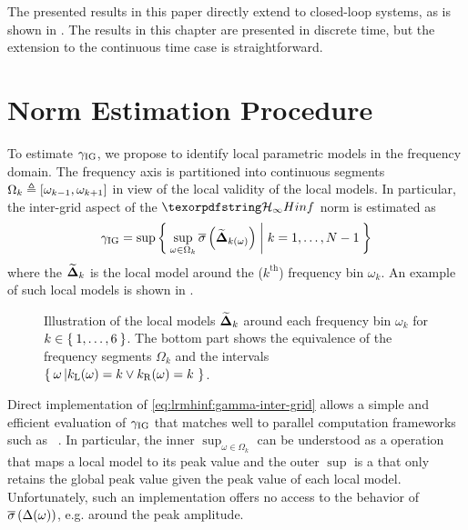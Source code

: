 The presented results in this paper directly extend to closed-loop systems, as is shown in .
The results in this chapter are presented in discrete time, but the extension to the continuous time case is straightforward.

\section{\Hinf{} Norm Estimation Procedure}
\label{sec:lrmhinf:LPMHinf}
To estimate $\gammaIntergrid$, we propose to identify local parametric models in the frequency domain.
The frequency axis is partitioned into continuous segments $\Omega_k \isdef \ClosedInterval{ \omega_{k-1} , \omega_{k+1} }$ in view of the local validity of the local models.
In particular, the inter-grid aspect of the $\Hinf$ norm is estimated as
\begin{equation}
  \gammaIntergrid = 
    \sup \Set{ 
                \sup_{\omega \in \Omega_k} \svdMax{\LocalModel[k(\omega)]{\Delta}}
                |
                k = 1,\ldots,N-1
                }
   \label{eq:lrmhinf:gamma-inter-grid}
\end{equation}
where the $\LocalModel[k]{\Delta}$ is the local model around the ($k^{\text{th}}$) frequency bin $\omega_k$.
An example of such local models is shown in .

\begin{figure}
  \centering
  \setlength{\figurewidth}{0.68\columnwidth}
  \setlength{\figureheight}{0.68\figurewidth}
  
  \caption[Illustration of the local models.]{Illustration of the local models $\LocalModel[k]{\Delta}$ around each frequency bin $\omega_k$ for $k\in\Set{1,\ldots,6}$.
  The bottom part shows the equivalence of the frequency segments $\Omega_k$ and the intervals $\Set{\omega \given{\leftAdjacent(\omega) = k \vee \rightAdjacent(\omega) = k}}$.}
\label{fig:lrmhinf:interpol-quantities}
\end{figure}

Direct implementation of \eqref{eq:lrmhinf:gamma-inter-grid} allows a simple and efficient evaluation of $\gammaIntergrid$ that matches well to parallel computation frameworks such as ~\citep{Dean2008}.
In particular, the inner $\sup_{\omega\in\Omega_k}$ can be understood as a  operation that maps a local model to its peak value and the outer $\sup$ is a  that only retains the global peak value given the peak value of each local model.
Unfortunately, such an implementation offers no access to the behavior of $\svdMax{\Delta(\omega)}$, e.g. around the peak amplitude.

